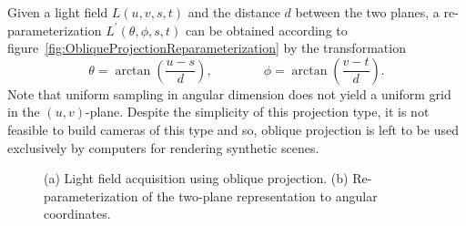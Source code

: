 Given a light field $L(u, v, s, t)$ and the distance $d$ between the two planes, a re-parameterization $L^{\prime}(\theta, \phi, s, t)$ can be obtained according to figure~\ref{fig:ObliqueProjectionReparameterization} by the transformation
\begin{equation}
	\theta = \arctan\left(\frac{u - s}{d}\right), 
	\qquad \qquad
	\phi = \arctan\left(\frac{v - t}{d}\right).
\end{equation}
Note that uniform sampling in angular dimension does not yield a uniform grid in the $(u, v)$-plane.
Despite the simplicity of this projection type, it is not feasible to build cameras of this type and so, oblique projection is left to be used exclusively by computers for rendering synthetic scenes.
\begin{figure}[tb]
	\subcaptionbox{\label{fig:ObliqueProjection}}{}\hfill%
	\subcaptionbox{\label{fig:ObliqueProjectionReparameterization}}{}
	\caption[Parameterization for light fields from oblique projections]
			{(a) Light field acquisition using oblique projection. 
			 (b) Re-parameterization of the two-plane representation to angular coordinates.}
\end{figure}


